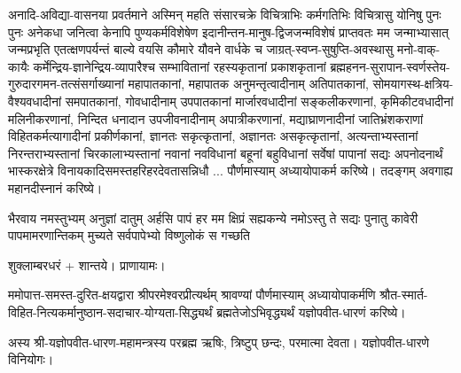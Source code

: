 अनादि-अविद्या-वासनया प्रवर्तमाने अस्मिन् महति संसारचक्रे विचित्राभिः
कर्मगतिभिः विचित्रासु योनिषु पुनः पुनः अनेकधा जनित्वा केनापि पुण्यकर्मविशेषेण
इदानीन्तन-मानुष-द्विजजन्मविशेषं प्राप्त\-वतः मम जन्माभ्यासात् जन्मप्रभृति एतत्क्षण\-पर्यन्तं बाल्ये वयसि
कौमारे यौवने वार्धके च जाग्रत्-स्वप्न-सुषुप्ति-अवस्थासु मनो-वाक्-कायैः
कर्मेन्द्रिय-ज्ञानेन्द्रिय-व्यापारैश्च सम्भावितानां रहस्यकृतानां प्रकाशकृतानां ब्रह्महनन-सुरापान-स्वर्णस्तेय-गुरुदारगमन-तत्संसर्गाख्यानां महा\-पातकानां, महापातक अनुमन्तृत्वादीनाम् अति\-पातकानां,
सोमयागस्थ-क्षत्रिय-वैश्य\-वधादीनां सम\-पातकानां, गो\-वधादीनाम् उप\-पातकानां मार्जार\-वधादीनां सङ्कली\-करणानां,
कृमिकीट\-वधादीनां मलिनी\-करणानां, निन्दित धनादान उपजीवनादीनाम् अपात्री\-करणानां, मद्याघ्राणनादीनां जातिभ्रंशकराणां विहितकर्मत्यागादीनां
प्रकीर्णकानां, ज्ञानतः सकृत्कृतानां, अज्ञानतः असकृत्कृतानां, अत्यन्ताभ्यस्तानां निरन्तरा\-भ्यस्तानां
चिरकालाभ्यस्तानां नवानां नवविधानां बहूनां बहुविधानां सर्वेषां पापानां सद्यः अपनोदनार्थं
भास्कर\-क्षेत्रे  विनायकादि\-समस्त\-हरिहर\-देवतासन्निधौ ... पौर्णमास्याम् अध्यायोपा\-कर्म करिष्ये।  तदङ्गम्
अवगाह्य महानदीस्नानं करिष्ये।\\

{भैरवाय नमस्तुभ्यम् अनुज्ञां दातुम् अर्हसि}%
{पापं हर मम क्षिप्रं सह्यकन्ये नमोऽस्तु ते}%
{सद्यः पुनातु कावेरी पापमामरणान्तिकम्}%
{मुच्यते सर्वपापेभ्यो विष्णुलोकं स गच्छति}%




शुक्लाम्बरधरं + शान्तये। प्राणायामः।

ममोपात्त-समस्त-दुरित-क्षयद्वारा श्रीपरमेश्वरप्रीत्यर्थम् श्रावण्यां पौर्णमास्याम् अध्यायोपाकर्मणि 
श्रौत-स्मार्त-विहित-नित्यकर्मानुष्ठान-सदाचार-योग्यता-सिद्ध्यर्थं
ब्रह्मतेजो\-ऽभि\-वृद्ध्यर्थं यज्ञोपवीत-धारणं करिष्ये।

अस्य श्री-यज्ञोपवीत-धारण-महामन्त्रस्य परब्रह्म ऋषिः, त्रिष्टुप् छन्दः, परमात्मा देवता।
यज्ञोपवीत-धारणे विनियोगः।


